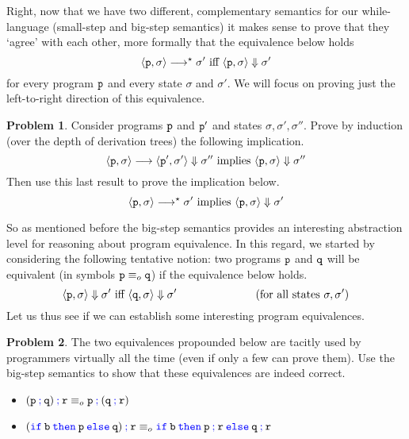 \documentclass[a4paper, 11pt]{article}
\theoremstyle{definition}
\newtheorem{problem}{Problem}
\newcommand{\blue}[1]{\textcolor{blue}{#1}}
\begin{document}
Right, now that we have two different, complementary semantics for our
while-language (small-step and big-step semantics) it makes sense to prove that
they `agree' with each other, more formally that the equivalence below holds
       \[
                \langle \mathtt{p}, \sigma \rangle \longrightarrow^\star \sigma'
                \text{ iff } \langle \mathtt{p}, \sigma \rangle \Downarrow \sigma'
       \]
for every program $\mathtt{p}$ and every state $\sigma$ and $\sigma'$. We will
focus on proving just the left-to-right direction of this equivalence.
\begin{problem}
       Consider programs $\mathtt{p}$ and $\mathtt{p'}$ and states
       $\sigma,\sigma',\sigma''$. Prove by induction (over the depth of
       derivation trees) the following implication.
       \[
               \langle \mathtt{p}, \sigma \rangle \longrightarrow \langle \mathtt{p'}, \sigma' \rangle
               \Downarrow \sigma'' \text{ implies } \langle \mathtt{p}, \sigma \rangle \Downarrow \sigma''
       \]
       Then use this last result to prove the implication below.
       \[
                \langle \mathtt{p}, \sigma \rangle \longrightarrow^\star \sigma'
                \text{ implies } \langle \mathtt{p}, \sigma \rangle \Downarrow \sigma'
       \]
\end{problem}

So as mentioned before the big-step semantics provides an interesting
abstraction level for reasoning about program equivalence.  In this regard, we
started by considering the following tentative notion: two programs $\mathtt{p}$
and $\mathtt{q}$ will be equivalent (in symbols $\mathtt{p} \equiv_o \mathtt{q}$) if
the equivalence below holds.
       \[
                \langle \mathtt{p}, \sigma \rangle \Downarrow \sigma'
                \text{ iff } \langle \mathtt{q}, \sigma \rangle \Downarrow \sigma'
                \hspace{2.5cm} (\text{for all states } \sigma,\sigma')
       \]
Let us thus see if we can establish some interesting program equivalences.
\begin{problem}
        The two equivalences propounded below are tacitly used by programmers
        virtually all the time (even if only a few can prove them). Use the
        big-step semantics to show that these equivalences are indeed correct.
        \begin{itemize}
                \item $\mathtt{(p \> \blue{ ;} \> q) \> {\blue ;} \> r} \equiv_o
                        \mathtt{p \> \blue{ ;} \> (q \> {\blue ;} \> r)}$
                \item $\mathtt{(\blue{ if} \> b \> \blue{ then} \> p \> \blue{ else} \> q) 
                      \> \blue{ ;} \> \prog{r}} \equiv_o 
                      \mathtt{\blue{ if} \> b \> \blue{ then} \> p \> \blue{ ;} \> r \> 
                      \blue{ else} \> q \> \blue{ ;} \> r}$ 
        \end{itemize}
\end{problem}
\end{document}
